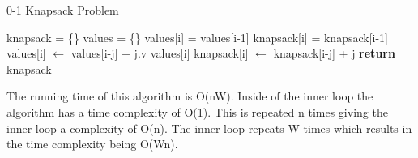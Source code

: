 \documentclass{article}
\begin{document}
\begin{enumerate}
\begin{algorithm}
    \caption{0-1 Knapsack Problem}\label{knap}
    \begin{algorithmic}[1]
      \State knapsack = \{\}
      \State values = \{\}
      	values[i] = values[i-1]
      	knapsack[i] = knapsack[i-1]
      			\State values[i] $\gets$ values[i-j] + j.v values[i]
      			\State knapsack[i] $\gets$ knapsack[i-j] + j
      		\EndIf
      	\EndFor
      \EndFor
      \State \textbf{return} knapsack
    \EndFunction
    \end{algorithmic}
\end{algorithm} 

The running time of this algorithm is O(nW). Inside of the inner loop the algorithm has a time complexity of O(1). This is repeated n times giving the inner loop a complexity of O(n). The inner loop repeats W times which results in the time complexity being O(Wn).

        
\end{enumerate}
\end{document}
